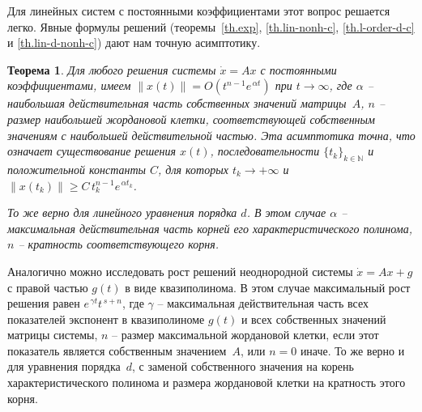 \documentclass[12pt,a4paper]{article}
\newtheorem{theorem}{Теорема}
\newcommand{\n}{{\mathbb N}}
\begin{document}
Для линейных систем с постоянными коэффициентами этот вопрос решается легко. Явные формулы решений
(теоремы~\ref{th.exp}, \ref{th.lin-nonh-c}, \ref{th.l-order-d-c} и  \ref{th.lin-d-nonh-c}) дают нам точную асимптотику.
\begin{theorem}\label{th.asymp1}
Для любого решения системы $\dot x = Ax$ с постоянными коэффициентами, имеем $\|x(t)\| = O(t^{n-1}e^{\, \alpha t})$ при
$t \to \infty$, где $\alpha$ -- наибольшая действительная часть собственных значений матрицы~$A$,
$n$ -- размер наибольшей жордановой клетки, соответствующей собственным значениям с наибольшей действительной частью.
Эта асимптотика точна, что означает существование решения $x(t)$,
последовательности $\{t_k\}_{k \in \n}$ и положительной константы
$C$, для которых $t_k \to +\infty$ и $\|x(t_k)\| \ge C\, t_k^{n-1}e^{\, \alpha t_k}$.

То же верно для линейного уравнения порядка $d$. В этом случае $\alpha$ -- максимальная
действительная часть корней его характеристического полинома, $n$ -- кратность соответствующего корня.
\end{theorem}
Аналогично можно исследовать рост решений неоднородной  системы $\dot x = Ax + g$ с правой частью $g(t)$
в виде квазиполинома. В этом случае максимальный рост решения равен $e^{\, \gamma  t}t^{\, s+n}$,
где $\gamma$ -- максимальная действительная часть всех показателей экспонент в квазиполиноме $g(t)$ и всех
собственных значений матрицы системы,
$n$ -- размер максимальной жордановой клетки, если этот показатель является собственным значением~$A$, или
$n=0$ иначе. То же верно и для уравнения порядка~$d$, с заменой собственного значения на корень характеристического полинома и размера жордановой клетки на кратность этого корня.
\smallskip
\end{document}

